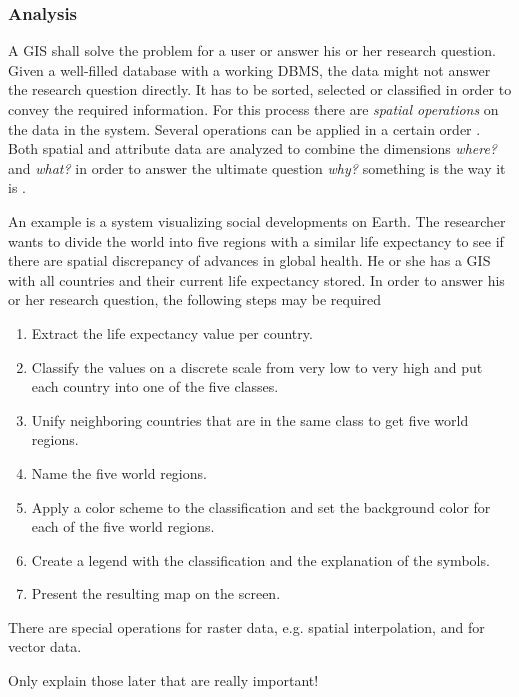 \subsubsection{Analysis} %
\label{ssub:analysis}

A GIS shall solve the problem for a user or answer his or her research question. Given a well-filled database with a working DBMS, the data might not answer the research question directly. It has to be sorted, selected or classified in order to convey the required information. For this process there are \emph{spatial operations} on the data in the system. Several operations can be applied in a certain order
\cite[pp. 321-325]{bolstad2008gis}.
Both spatial and attribute data are analyzed to combine the dimensions \emph{where?} and \emph{what?} in order to answer the ultimate question \emph{why?} something is the way it is
\cite[p.xii-xvi]{knowles2002past}.

An example is a system visualizing social developments on Earth. The researcher wants to divide the world into five regions with a similar life expectancy to see if there are spatial discrepancy of advances in global health. He or she has a GIS with all countries and their current life expectancy stored. In order to answer his or her research question, the following steps may be required

\begin{enumerate}
  \item Extract the life expectancy value per country.
  \item Classify the values on a discrete scale from very low to very high and put each country into one of the five classes.
  \item Unify neighboring countries that are in the same class to get five world regions.
  \item Name the five world regions.
  \item Apply a color scheme to the classification and set the background color for each of the five world regions.
  \item Create a legend with the classification and the explanation of the symbols.
  \item Present the resulting map on the screen.
\end{enumerate}

There are special operations for raster data, e.g. spatial interpolation, and for vector data.

Only explain those later that are really important!

